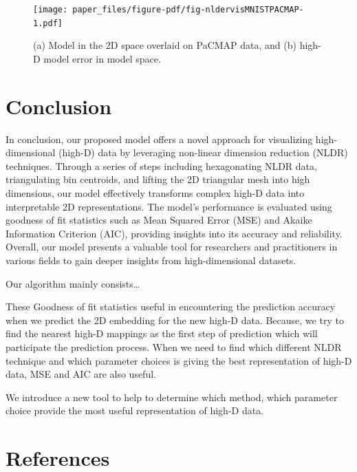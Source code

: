 \documentclass[
  12pt]{article}
\begin{document}
\begin{figure}[H]

{\centering \texttt{[image: paper\_files/figure-pdf/fig-nldervisMNISTPACMAP-1.pdf]}

}

\caption{\label{fig-nldervisMNISTPACMAP}(a) Model in the 2D space
overlaid on PaCMAP data, and (b) high-D model error in model space.}

\end{figure}

\hypertarget{sec-conclusion}{%
\section{Conclusion}\label{sec-conclusion}}

In conclusion, our proposed model offers a novel approach for
visualizing high-dimensional (high-D) data by leveraging non-linear
dimension reduction (NLDR) techniques. Through a series of steps
including hexagonating NLDR data, triangulating bin centroids, and
lifting the 2D triangular mesh into high dimensions, our model
effectively transforms complex high-D data into interpretable 2D
representations. The model's performance is evaluated using goodness of
fit statistics such as Mean Squared Error (MSE) and Akaike Information
Criterion (AIC), providing insights into its accuracy and reliability.
Overall, our model presents a valuable tool for researchers and
practitioners in various fields to gain deeper insights from
high-dimensional datasets.

Our algorithm mainly consists\ldots{}

These Goodness of fit statistics useful in encountering the prediction
accuracy when we predict the 2D embedding for the new high-D data.
Because, we try to find the nearest high-D mappings as the first step of
prediction which will participate the prediction process. When we need
to find which different NLDR technique and which parameter choices is
giving the best representation of high-D data, MSE and AIC are also
useful.

We introduce a new tool to help to determine which method, which
parameter choice provide the most useful representation of high-D data.

\hypertarget{references}{%
\section*{References}\label{references}}

\renewcommand{\bibsection}{}


\newpage{}
\end{document}
